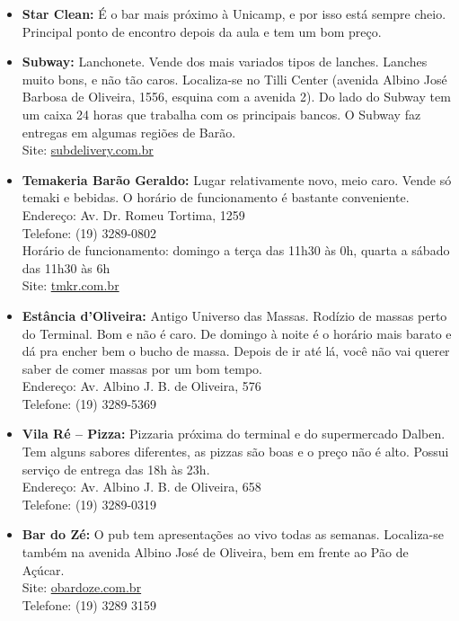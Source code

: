 \begin{itemize}
    \item   \textbf{Star Clean:} É o bar mais próximo à Unicamp, e por isso está
        sempre cheio. Principal ponto de encontro depois da aula e tem um bom
        preço.

    \item   \textbf{Subway:} Lanchonete. Vende dos mais variados tipos de
        lanches.  Lanches muito bons, e não tão caros. Localiza-se no Tilli
        Center (avenida Albino José Barbosa de Oliveira, 1556, esquina com a
        avenida 2). Do lado do Subway tem um caixa 24 horas que trabalha com os
        principais bancos. O Subway faz entregas em algumas regiões de Barão.
        \\Site: \url{subdelivery.com.br}

      \item \textbf{Temakeria Barão Geraldo:} Lugar relativamente novo, meio
        caro. Vende só temaki e bebidas. O horário de funcionamento é bastante
        conveniente.  
        \\Endereço: Av. Dr. Romeu Tortima, 1259 
        \\Telefone: (19) 3289-0802 
        \\Horário de funcionamento: domingo a terça das 11h30 às 0h, quarta a
        sábado das 11h30 às 6h 
        \\Site: \url{tmkr.com.br}

    \item   \textbf{Estância d'Oliveira:} Antigo Universo das Massas. Rodízio de
        massas perto do Terminal. Bom e não é caro. De domingo à noite é o
        horário mais barato e dá pra encher bem o bucho de massa. Depois de ir
        até lá, você não vai querer saber de comer massas por um bom tempo.
        \\Endereço: Av. Albino J. B. de Oliveira, 576
        \\Telefone: (19) 3289-5369 

    \item   \textbf{Vila Ré -- Pizza:} Pizzaria próxima do terminal e do
        supermercado Dalben. Tem alguns sabores diferentes, as pizzas são boas e
        o preço não é alto. Possui serviço de entrega das 18h às 23h.
        \\Endereço: Av. Albino J. B. de Oliveira, 658
        \\Telefone: (19) 3289-0319 %

    \item   \textbf{Bar do Zé:} O pub tem apresentações ao vivo todas as
        semanas.  Localiza-se também na avenida Albino José de Oliveira, bem em
        frente ao Pão de Açúcar.
        \\Site: \url{obardoze.com.br}
        \\Telefone: (19) 3289 3159


\end{itemize}

